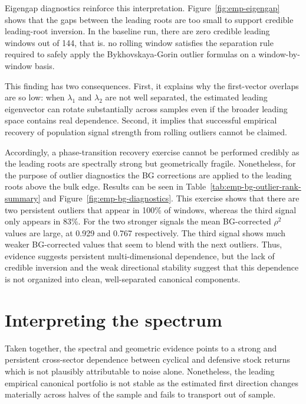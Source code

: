 \documentclass[12pt]{report} %
\begin{document}
Eigengap diagnostics reinforce this interpretation. Figure~\ref{fig:emp-eigengap} shows that the 
gaps between the leading roots are too small to support credible leading-root inversion. In the 
baseline run, there are zero credible leading windows out of 144, that is. no rolling window satisfies the 
separation rule required to safely apply the Bykhovskaya-Gorin outlier formulas on a window-by-window basis.


This finding has two consequences. First, it explains why the first-vector overlaps are so low: when 
$\lambda_1$ and $\lambda_2$ are not well separated, the estimated leading eigenvector can rotate 
substantially across samples even if the broader leading space contains real dependence. Second, it 
implies that successful empirical recovery of population signal strength from rolling outliers 
cannot be claimed.

Accordingly, a phase-transition recovery exercise cannot be performed credibly as the leading 
roots are spectrally strong but geometrically fragile. Nonetheless, for the purpose of outlier
diagnostics the BG corrections are applied to the leading roots above the bulk edge. Results 
can be seen in Table~\ref{tab:emp-bg-outlier-rank-summary} and Figure~\ref{fig:emp-bg-diagnostics}.
This exercise shows that there are two persistent outliers that appear in 100\% of windows, 
whereas the third signal only appears in 83\%.
For the two stronger signals the mean BG-corrected \(\rho^2\) values are large, at 0.929 and 
0.767 respectively. The third signal shows much weaker BG-corrected values that seem to 
blend with the next outliers.
Thus, evidence suggests persistent multi-dimensional dependence, 
but the lack of credible inversion and the weak directional stability suggest that this 
dependence is not organized into clean, well-separated canonical components.


\section{Interpreting the spectrum}

Taken together, the spectral and geometric evidence points to a strong and persistent cross-sector 
dependence between cyclical and defensive stock returns which is not plausibly attributable to noise alone. 
Nonetheless, the leading empirical canonical portfolio is not stable as the estimated 
first direction changes materially across halves of the sample and fails to transport out of sample.
\end{document}

